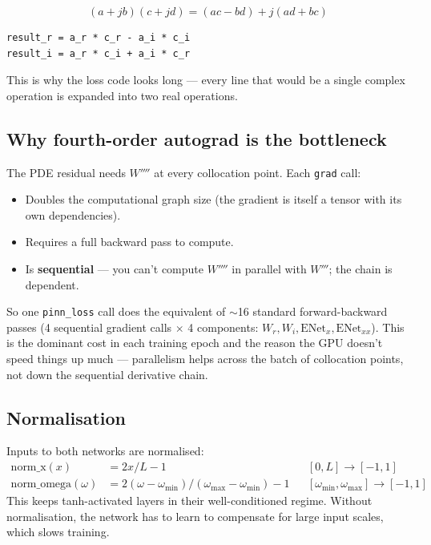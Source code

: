 \documentclass[11pt,a4paper]{article}
\begin{document}
\begin{equation}
(a + jb)(c + jd) = (ac - bd) + j(ad + bc)
\end{equation}
\begin{lstlisting}[caption={Manual complex multiplication}]
result_r = a_r * c_r - a_i * c_i
result_i = a_r * c_i + a_i * c_r
\end{lstlisting}
This is why the loss code looks long --- every line that would be a single complex operation is expanded into two real operations.

\subsection{Why fourth-order autograd is the bottleneck}

The PDE residual needs $W''''$ at every collocation point. Each \texttt{grad} call:
\begin{itemize}[leftmargin=*, itemsep=2pt]
\item Doubles the computational graph size (the gradient is itself a tensor with its own dependencies).
\item Requires a full backward pass to compute.
\item Is \textbf{sequential} --- you can't compute $W''''$ in parallel with $W'''$; the chain is dependent.
\end{itemize}
So one \texttt{pinn\_loss} call does the equivalent of $\sim$16 standard forward-backward passes (4 sequential gradient calls $\times$ 4 components: $W_r, W_i, \text{ENet}_x, \text{ENet}_{xx}$). This is the dominant cost in each training epoch and the reason the GPU doesn't speed things up much --- parallelism helps across the batch of collocation points, not down the sequential derivative chain.

\subsection{Normalisation}

Inputs to both networks are normalised:
\begin{align}
\text{norm\_x}(x) &= 2x/L - 1 && [0, L] \to [-1, 1] \\
\text{norm\_omega}(\omega) &= 2(\omega - \omega_\text{min})/(\omega_\text{max} - \omega_\text{min}) - 1 && [\omega_\text{min}, \omega_\text{max}] \to [-1, 1]
\end{align}
This keeps tanh-activated layers in their well-conditioned regime. Without normalisation, the network has to learn to compensate for large input scales, which slows training.
\end{document}
